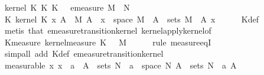 \begin{isabellebody}
\ {\isachardoublequoteopen}kernel\ {\isacharparenleft}{\kern0pt}K\ {\isasymcirc}\isactrlsub K\ K\ {\isasymomega}\ {\isacharequal}{\kern0pt}\ emeasure\ {\isacharparenleft}{\kern0pt}M\ {\isasymstar}\ N{\isacharparenright}{\kern0pt}{\isachardoublequoteclose}\ \isanewline
%
\isadelimproof
%
\endisadelimproof
%
\isatagproof
{}\isamarkupfalse%
\ {\isacharminus}{\kern0pt}\isanewline
\ \ \isamarkupfalse%
\ K{}{\isacharcolon}{\kern0pt}\ {\isachardoublequoteopen}kernel\ K\ x\ A{\isacharprime}{\kern0pt}\ {\isacharequal}{\kern0pt}\ M\ A{\isacharprime}{\kern0pt}{\isachardoublequoteclose}\ \ {\isachardoublequoteopen}x\ {\isasymin}\ space\ M\ {\isasymand}\ A{\isacharprime}{\kern0pt}\ {\isasymin}\ sets\ M{\isachardoublequoteclose}\ \ A{\isacharprime}{\kern0pt}\ x\isanewline
\ \ \ \ \isamarkupfalse%
\ Kdef\isanewline
\ \ \ \ \isamarkupfalse%
\ {\isacharparenleft}{\kern0pt}metis\ that\ emeasure{\isacharunderscore}{\kern0pt}transition{\isacharunderscore}{\kern0pt}kernel\ kernel{\isacharunderscore}{\kern0pt}apply{\isacharunderscore}{\kern0pt}kernel{\isacharunderscore}{\kern0pt}of{\isacharparenright}{\kern0pt}\isanewline
\ \ \isamarkupfalse%
\ K{}{\isacharunderscore}{\kern0pt}measure{\isacharcolon}{\kern0pt}\ {\isachardoublequoteopen}kernel{\isacharunderscore}{\kern0pt}measure\ K\ {\isasymomega}\ {\isacharequal}{\kern0pt}\ M{\isachardoublequoteclose}\isanewline
\ \ \ \ \isamarkupfalse%
\ {\isacharparenleft}{\kern0pt}rule\ measure{\isacharunderscore}{\kern0pt}eqI{\isacharparenright}{\kern0pt}\isanewline
\ \ \ \ \isamarkupfalse%
\ {\isacharparenleft}{\kern0pt}simp{\isacharunderscore}{\kern0pt}all\ add{\isacharcolon}{\kern0pt}\ Kdef\ emeasure{\isacharunderscore}{\kern0pt}transition{\isacharunderscore}{\kern0pt}kernel{\isacharparenright}{\kern0pt}\isanewline
\ \ \isamarkupfalse%
\ {\isacharbrackleft}{\kern0pt}measurable{\isacharbrackright}{\kern0pt}{\isacharcolon}{\kern0pt}\ {\isachardoublequoteopen}{\isacharbraceleft}{\kern0pt}x{\isachardot}{\kern0pt}\ x\ {\isacharplus}{\kern0pt}\ a\ {\isasymin}\ A{\isacharprime}{\kern0pt}{\isacharbraceright}{\kern0pt}\ {\isasymin}\ sets\ N{\isachardoublequoteclose}\ \ {\isachardoublequoteopen}a\ {\isasymin}\ space\ N{\isachardoublequoteclose}\ {\isachardoublequoteopen}A{\isacharprime}{\kern0pt}\ {\isasymin}\ sets\ N{\isachardoublequoteclose}\ \ a\ A{\isacharprime}{\kern0pt}\isanewline

\end{isabellebody}

